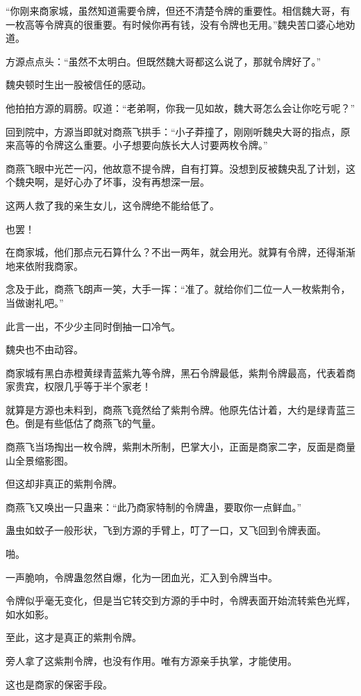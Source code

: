 \begin{this_body}
“你刚来商家城，虽然知道需要令牌，但还不清楚令牌的重要性。相信魏大哥，有一枚高等令牌真的很重要。有时候你再有钱，没有令牌也无用。”魏央苦口婆心地劝道。

方源点点头：“虽然不太明白。但既然魏大哥都这么说了，那就令牌好了。”

魏央顿时生出一股被信任的感动。

他拍拍方源的肩膀。叹道：“老弟啊，你我一见如故，魏大哥怎么会让你吃亏呢？”

回到院中，方源当即就对商燕飞拱手：“小子莽撞了，刚刚听魏央大哥的指点，原来高等的令牌这么重要。小子想要向族长大人讨要两枚令牌。”

商燕飞眼中光芒一闪，他故意不提令牌，自有打算。没想到反被魏央乱了计划，这个魏央啊，是好心办了坏事，没有再想深一层。

这两人救了我的亲生女儿，这令牌绝不能给低了。

也罢！

在商家城，他们那点元石算什么？不出一两年，就会用光。就算有令牌，还得渐渐地来依附我商家。

念及于此，商燕飞朗声一笑，大手一挥：“准了。就给你们二位一人一枚紫荆令，当做谢礼吧。”

此言一出，不少少主同时倒抽一口冷气。

魏央也不由动容。

商家城有黑白赤橙黄绿青蓝紫九等令牌，黑石令牌最低，紫荆令牌最高，代表着商家贵宾，权限几乎等于半个家老！

就算是方源也未料到，商燕飞竟然给了紫荆令牌。他原先估计着，大约是绿青蓝三色。倒是有些低估了商燕飞的气量。

商燕飞当场掏出一枚令牌，紫荆木所制，巴掌大小，正面是商家二字，反面是商量山全景缩影图。

但这却非真正的紫荆令牌。

商燕飞又唤出一只蛊来：“此乃商家特制的令牌蛊，要取你一点鲜血。”

蛊虫如蚊子一般形状，飞到方源的手臂上，叮了一口，又飞回到令牌表面。

啪。

一声脆响，令牌蛊忽然自爆，化为一团血光，汇入到令牌当中。

令牌似乎毫无变化，但是当它转交到方源的手中时，令牌表面开始流转紫色光辉，如水如影。

至此，这才是真正的紫荆令牌。

旁人拿了这紫荆令牌，也没有作用。唯有方源亲手执掌，才能使用。

这也是商家的保密手段。


\end{this_body}
